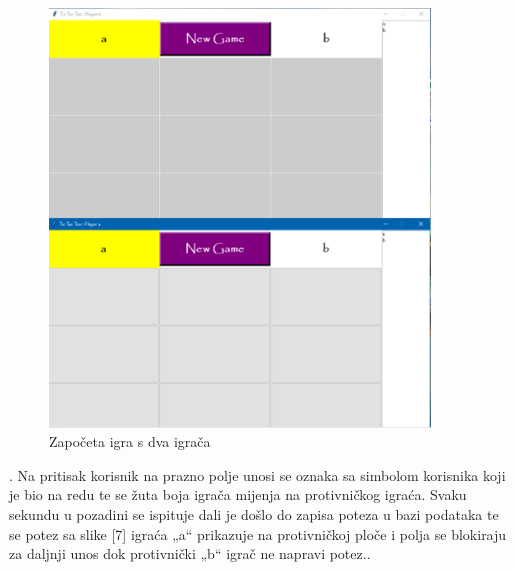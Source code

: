 \documentclass[]{foi} %
\begin{document}
\begin{figure}[]
    \centering
    \includegraphics[width=0.9\textwidth]{slike/igranje_2.png}
    \caption{Započeta igra s dva igrača \cite{Vlastita izrada}}
    \label{fig:podjela}
\end{figure}


.
Na pritisak korisnik na prazno polje unosi se oznaka sa simbolom korisnika koji je bio na redu te se žuta boja igrača mijenja na protivničkog igraća. Svaku sekundu u pozadini se ispituje dali je došlo do zapisa poteza u bazi podataka te se potez sa slike [7] igraća „a“ prikazuje na protivničkoj ploče i polja se blokiraju za daljnji unos dok protivnički „b“ igrač ne napravi potez..
\end{document}
